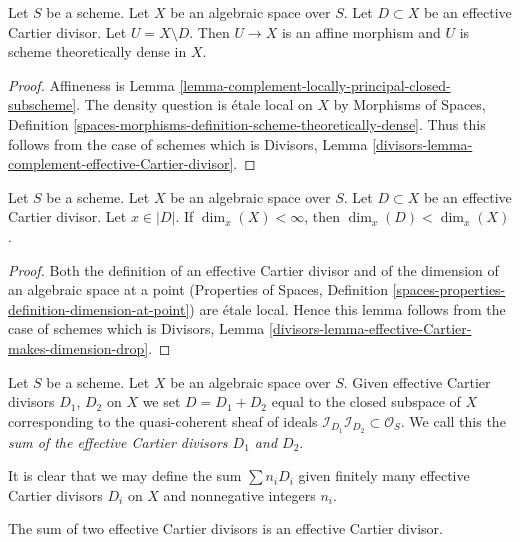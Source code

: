 \begin{lemma}
\label{lemma-complement-effective-Cartier-divisor}
Let $S$ be a scheme. Let $X$ be an algebraic space over $S$.
Let $D \subset X$ be an effective Cartier divisor.
Let $U = X \setminus D$. Then $U \to X$ is an affine morphism and $U$
is scheme theoretically dense in $X$.
\end{lemma}

\begin{proof}
Affineness is Lemma \ref{lemma-complement-locally-principal-closed-subscheme}.
The density question is \'etale local on $X$ by
Morphisms of Spaces, Definition
\ref{spaces-morphisms-definition-scheme-theoretically-dense}.
Thus this follows from the case of schemes which is
Divisors, Lemma
\ref{divisors-lemma-complement-effective-Cartier-divisor}.
\end{proof}

\begin{lemma}
\label{lemma-effective-Cartier-makes-dimension-drop}
Let $S$ be a scheme. Let $X$ be an algebraic space over $S$.
Let $D \subset X$ be an effective Cartier divisor.
Let $x \in |D|$.
If $\dim_x(X) < \infty$, then $\dim_x(D) < \dim_x(X)$.
\end{lemma}

\begin{proof}
Both the definition of an effective Cartier divisor and of the
dimension of an algebraic space at a point
(Properties of Spaces, Definition
\ref{spaces-properties-definition-dimension-at-point})
are \'etale local. Hence this lemma follows from the case of schemes
which is
Divisors, Lemma \ref{divisors-lemma-effective-Cartier-makes-dimension-drop}.
\end{proof}

\begin{definition}
\label{definition-sum-effective-Cartier-divisors}
Let $S$ be a scheme. Let $X$ be an algebraic space over $S$.
Given effective Cartier divisors
$D_1$, $D_2$ on $X$ we set $D = D_1 + D_2$ equal to the
closed subspace of $X$ corresponding to the quasi-coherent
sheaf of ideals
$\mathcal{I}_{D_1}\mathcal{I}_{D_2} \subset \mathcal{O}_S$.
We call this the {\it sum of the effective Cartier divisors
$D_1$ and $D_2$}.
\end{definition}

\noindent
It is clear that we may define the sum $\sum n_iD_i$ given
finitely many effective Cartier divisors $D_i$ on $X$
and nonnegative integers $n_i$.

\begin{lemma}
\label{lemma-sum-effective-Cartier-divisors}
The sum of two effective Cartier divisors is an effective
Cartier divisor.
\end{lemma}

